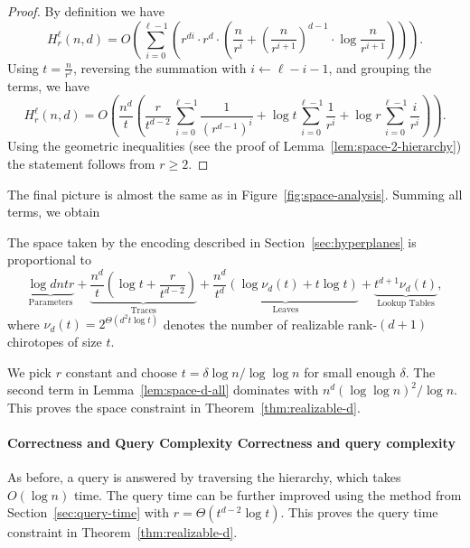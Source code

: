 \begin{proof}
By definition we have
\begin{displaymath}
H_r^\ell(n,d)
= O \left(
  \sum_{i=0}^{\ell-1} \left(
	r^{di} \cdot r^d \cdot \left(
	  \frac{n}{r^i} + {\left(\frac{n}{r^{i+1}}\right)}^{d-1} \cdot \log \frac{n}{r^{i+1}}
    \right)
  \right)
\right).
\end{displaymath}
%
Using \(t = \frac{n}{r^{\ell}}\), reversing the summation with
\(i \leftarrow \ell - i - 1\), and grouping the terms, we have
\begin{displaymath}
H_r^\ell(n,d)
=
O \left(
\frac{n^d}{t} \left(
	\frac{r}{t^{d-2}}
	\sum_{i=0}^{\ell-1} \frac{1}{{(r^{d-1})}^i}
	+
	\log t
	\sum_{i=0}^{\ell-1} \frac{1}{r^i}
	+
	\log r
	\sum_{i=0}^{\ell-1} \frac{i}{r^i}
\right)
\right).
\end{displaymath}
%
Using the geometric inequalities
(see the proof of Lemma~\ref{lem:space-2-hierarchy})
the statement follows from \(r \geq 2\).
%
\end{proof}


The final picture is almost the same as in Figure~\ref{fig:space-analysis}.
%
Summing all terms, we obtain
%
\begin{lemma}\label{lem:space-d-all}
    The space taken by the encoding described in Section~\ref{sec:hyperplanes}
    is proportional to
    \begin{displaymath}
      \underbrace{\log dntr}_{\text{Parameters}}
      +
      \underbrace{\frac{n^d}{t} \left( \log t + \frac{r}{t^{d-2}} \right)}_{\text{Traces}}
      +
      \underbrace{\frac{n^d}{t^d} ( \log \nu_d(t) + t \log t )}_{\text{Leaves}}
      +
      \underbrace{t^{d+1}\nu_d(t)}_{\text{Lookup Tables}},
    \end{displaymath}
    where \(\nu_d(t) = 2^{\Theta(d^2 t \log t)}\) denotes the number of
    realizable rank-\((d+1)\) chirotopes of size \(t\).
\end{lemma}

We pick \(r\) constant and choose \(t = \delta \log n / \log \log n\) for small
enough \(\delta\). The second term in Lemma~\ref{lem:space-d-all} dominates
with \(n^d {(\log \log n)}^2 / \log n\). This proves the space constraint in
Theorem~\ref{thm:realizable-d}.

\paragraph*{\iftitlecase%
Correctness and Query Complexity\else%
Correctness and query complexity\fi}
As before, a query is answered by traversing the hierarchy, which takes
\(O(\log n)\) time. The query time can be further improved using the method from
Section~\ref{sec:query-time} with \(r = \Theta(t^{d-2} \log t)\). This proves the
query time constraint in Theorem~\ref{thm:realizable-d}.

